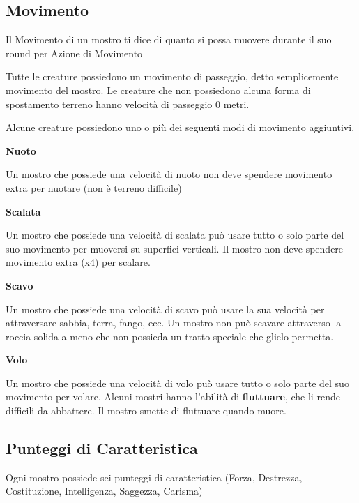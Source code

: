 \begin{multicols}{2}
	\subsection{Movimento}

	Il Movimento di un mostro ti dice di quanto si possa muovere durante il suo round per Azione di Movimento

	Tutte le creature possiedono un movimento di passeggio, detto semplicemente movimento del mostro. Le creature che non possiedono alcuna forma di spostamento terreno hanno velocità di passeggio 0 metri.

	Alcune creature possiedono uno o più dei seguenti modi di movimento aggiuntivi.

	\smallskip\textbf{Nuoto}

	Un mostro che possiede una velocità di nuoto non deve spendere movimento extra per nuotare (non è terreno difficile)

	\smallskip\textbf{Scalata}

	Un mostro che possiede una velocità di scalata può usare tutto o solo parte del suo movimento per muoversi su superfici verticali. Il mostro non deve spendere movimento extra (x4) per scalare.

	\smallskip\textbf{Scavo}

	Un mostro che possiede una velocità di scavo può usare la sua velocità per attraversare sabbia, terra, fango, ecc. Un mostro non può scavare attraverso la roccia solida a meno che non possieda un tratto speciale che glielo permetta.

	\smallskip\textbf{Volo}

	Un mostro che possiede una velocità di volo può usare tutto o solo parte del suo movimento per volare. Alcuni mostri hanno l'abilità di \textbf{fluttuare}, che li rende difficili da abbattere. Il mostro smette di fluttuare quando muore.

	\subsection{Punteggi di Caratteristica}

	Ogni mostro possiede sei punteggi di caratteristica (Forza, Destrezza, Costituzione, Intelligenza, Saggezza, Carisma)



\end{multicols}
